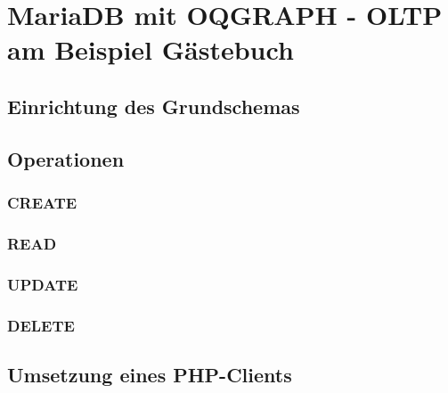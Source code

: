 \chapter{MariaDB mit OQGRAPH - OLTP am Beispiel Gästebuch}
\section{Einrichtung des Grundschemas}
\section{Operationen}
\subsection{CREATE}
\subsection{READ}
\subsection{UPDATE}
\subsection{DELETE}
\section{Umsetzung eines PHP-Clients}
